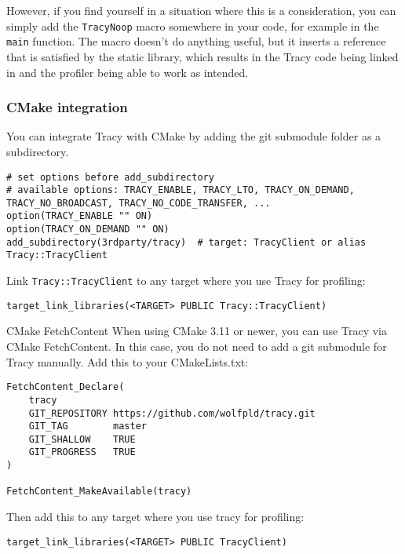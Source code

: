 \documentclass[hidelinks,titlepage,a4paper,twoside]{article}
\begin{document}
However, if you find yourself in a situation where this is a consideration, you can simply add the \texttt{TracyNoop} macro somewhere in your code, for example in the \texttt{main} function. The macro doesn't do anything useful, but it inserts a reference that is satisfied by the static library, which results in the Tracy code being linked in and the profiler being able to work as intended.

\subsubsection{CMake integration}

You can integrate Tracy with CMake by adding the git submodule folder as a subdirectory.

\begin{lstlisting}
# set options before add_subdirectory
# available options: TRACY_ENABLE, TRACY_LTO, TRACY_ON_DEMAND, TRACY_NO_BROADCAST, TRACY_NO_CODE_TRANSFER, ...
option(TRACY_ENABLE "" ON)
option(TRACY_ON_DEMAND "" ON)
add_subdirectory(3rdparty/tracy)  # target: TracyClient or alias Tracy::TracyClient
\end{lstlisting}

Link \texttt{Tracy::TracyClient} to any target where you use Tracy for profiling:

\begin{lstlisting}
target_link_libraries(<TARGET> PUBLIC Tracy::TracyClient)
\end{lstlisting}

\begin{bclogo}[
noborder=true,
couleur=black!5,
logo=\bclampe
]{CMake FetchContent}
When using CMake 3.11 or newer, you can use Tracy via CMake FetchContent. In this case, you do not need to add a git submodule for Tracy manually. Add this to your CMakeLists.txt:

\begin{lstlisting}
FetchContent_Declare(
    tracy
    GIT_REPOSITORY https://github.com/wolfpld/tracy.git
    GIT_TAG        master
    GIT_SHALLOW    TRUE
    GIT_PROGRESS   TRUE
)

FetchContent_MakeAvailable(tracy)
\end{lstlisting}

Then add this to any target where you use tracy for profiling:

\begin{lstlisting}
target_link_libraries(<TARGET> PUBLIC TracyClient)
\end{lstlisting}
\end{bclogo}
\end{document}
